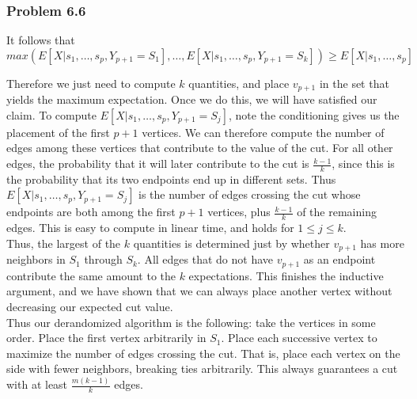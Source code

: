 \documentclass[12pt,letterpaper]{article}
\newenvironment{answer}[1]{
  \subsubsection*{Problem #1}
}{\newpage}
\begin{document}
\begin{answer}{6.6}
\begin{itemize}
	It follows that
	$$max(E[X | s_1,\ldots, s_p, Y_{p+1}=S_1], \ldots, E[X | s_1,\ldots, s_p, Y_{p+1} = S_k]) \ge E[X | s_1,\ldots, s_p]$$

	Therefore we just need to compute $k$ quantities, and place $v_{p+1}$ in the set that yields the maximum expectation. Once we do this, we will have satisfied our claim. To compute $E[X | s_1, \ldots, s_p, Y_{p+1} = S_j]$, note the conditioning gives us the placement of the first $p+1$ vertices. We can therefore compute the number of edges among these vertices that contribute to the value of the cut. For all other edges, the probability that it will later contribute to the cut is $\frac{k-1}{k}$, since this is the probability that its two endpoints end up in different sets. Thus $E[X | s_1, \ldots, s_p, Y_{p+1} = S_j]$ is the number of edges crossing the cut whose endpoints are both among the first $p + 1$ vertices, plus $\frac{k-1}{k}$ of the remaining edges. This is easy to compute in linear time, and holds for $1 \le j \le k$.\\

	Thus, the largest of the $k$ quantities is determined just by whether $v_{p+1}$ has more neighbors in $S_1$ through $S_k$. All edges that do not have $v_{p+1}$ as an endpoint contribute the same amount to the $k$ expectations. This finishes the inductive argument, and we have shown that we can always place another vertex without decreasing our expected cut value.\\

	Thus our derandomized algorithm is the following: take the vertices in some order. Place the first vertex arbitrarily in $S_1$. Place each successive vertex to maximize the number of edges crossing the cut. That is, place each vertex on the side with fewer neighbors, breaking ties arbitrarily. This always guarantees a cut with at least $\frac{m(k-1)}{k}$ edges.
\end{itemize}
\end{answer}
\end{document}

